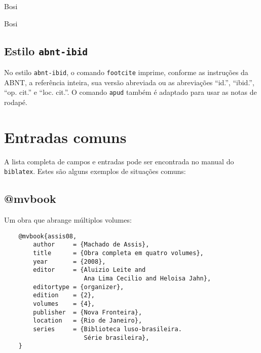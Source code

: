 \documentclass[a4paper]{article}
\begin{document}
\begin{example}
\textcite{bosi08}
\end{example}

\begin{example}
Bosi \cite{bosi08}
\end{example}

\begin{example}
Bosi \supercite{bosi08}
\end{example}


\begingroup
\let\clearpage\relax
\subsection{Estilo \texttt{abnt-ibid}}%
\endgroup

No estilo \texttt{abnt-ibid}, o comando \texttt{footcite} imprime, conforme as
instruções da ABNT, a referência inteira, sua versão abreviada ou as
abreviações ``id.'', ``ibid.'', ``op. cit.'' e ``loc. cit.''. O comando
\texttt{apud} também é adaptado para usar as notas de rodapé.



\clearpage
\section{Entradas comuns}%

A lista completa de campos e entradas pode ser encontrada no manual do
\texttt{biblatex}. Estes são alguns exemplos de situações comuns:

\begingroup
\let\clearpage\relax
\subsection{@mvbook}%
\endgroup

Um obra que abrange múltiplos volumes:

\begin{verbatim}
    @mvbook{assis08,
        author     = {Machado de Assis},
        title      = {Obra completa em quatro volumes},
        year       = {2008},
        editor     = {Aluizio Leite and
                      Ana Lima Cecilio and Heloisa Jahn},
        editortype = {organizer},
        edition    = {2},
        volumes    = {4},
        publisher  = {Nova Fronteira},
        location   = {Rio de Janeiro},
        series     = {Biblioteca luso-brasileira.
                      Série brasileira},
    }
\end{verbatim}
\end{document}
